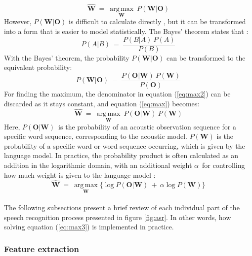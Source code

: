 \documentclass[english, 12pt, a4paper, pdftex, elec, utf8]{aaltothesis}
\DeclareMathOperator*{\argmax}{arg\,max}
\begin{document}
\begin{equation} \label{eq:max}
\hat{\bm{W}} \ = \ \underset{\bm{W}}{\argmax} \ P(\bm{W} | \bm{O})
\end{equation}
However, $P(\bm{W} | \bm{O})$ is difficult to calculate directly \cite{gales2008application}, but it can be transformed into a form that is easier to model statistically. The Bayes' theorem states that \cite[p.~10]{hori2013speech}:
\begin{equation}
P(A | B) \ = \ \frac{P(B | A) \ P(A)}{P(B)}
\end{equation}
With the Bayes' theorem, the probability $P(\bm{W} | \bm{O})$ can be transformed to the equivalent probability:
\begin{equation} \label{eq:max2}
P(\bm{W} | \bm{O}) \ = \ \frac{P(\bm{O} | \bm{W}) \ P(\bm{W})}{P(\bm{O})}
\end{equation}
For finding the maximum, the denominator in equation (\ref{eq:max2}) can be discarded as it stays constant, and equation (\ref{eq:max}) becomes:
\begin{equation} \label{eq:max3}
\hat{\bm{W}} \ = \ \underset{\bm{W}}{\argmax} \ P(\bm{O} | \bm{W}) \ P(\bm{W})
\end{equation}
Here, $P(\bm{O} | \bm{W})$ is the probability of an acoustic observation sequence for a specific word sequence, corresponding to the acoustic model. $P(\bm{W})$ is the probability of a specific word or word sequence occurring, which is given by the language model. In practice, the probability product is often calculated as an addition in the logarithmic domain, with an additional weight $\alpha$ for controlling how much weight is given to the language model \cite[p.~200]{gales2008application}:
\begin{equation}
\hat{\bm{W}} \ = \ \underset{\bm{W}}{\argmax} \big\{ \log P(\bm{O} | \bm{W}) \ + \ \alpha \log P(\bm{W}) \big\}
\end{equation} \\
The following subsections present a brief review of each individual part of the speech recognition process presented in figure \ref{fig:asr}. In other words, how solving equation (\ref{eq:max3}) is implemented in practice.

\subsubsection{Feature extraction}
\end{document}
